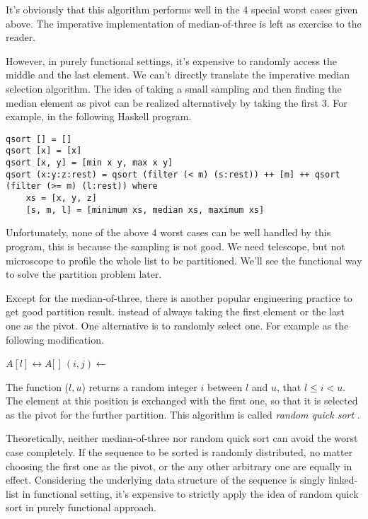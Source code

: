 \documentclass[UTF8]{article}
\begin{document}
It's obviously that this algorithm performs well in the 4 special worst cases given above.
The imperative implementation of median-of-three is left as exercise to the reader.

However, in purely functional settings, it's expensive to randomly access the middle and the last
element. We can't directly translate the imperative median selection algorithm. The idea of
taking a small sampling and then finding the median element as pivot can be realized alternatively
by taking the first 3. For example, in the following Haskell program.

\lstset{language=Haskell}
\begin{lstlisting}
qsort [] = []
qsort [x] = [x]
qsort [x, y] = [min x y, max x y]
qsort (x:y:z:rest) = qsort (filter (< m) (s:rest)) ++ [m] ++ qsort (filter (>= m) (l:rest)) where
    xs = [x, y, z]
    [s, m, l] = [minimum xs, median xs, maximum xs]
\end{lstlisting}

Unfortunately, none of the above 4 worst cases can be well handled by this program, this is because
the sampling is not good. We need telescope, but not microscope to profile the whole list to be
partitioned. We'll see the functional way to solve the partition problem later.

Except for the median-of-three, there is another popular engineering practice to get good partition
result. instead of always taking the first element or the last one as the pivot. One alternative is
to randomly select one. For example as the following modification.

\begin{algorithmic}[1]
    \State {} $A[l] \leftrightarrow A[$  $]$
    \State $(i, j) \gets $ 
    \State {}
    \State {}
  \EndIf
\EndProcedure
\end{algorithmic}

The function ($l, u$) returns a random integer $i$ between $l$ and $u$, that
$l \leq i < u$. The element at this position is exchanged with the first one, so that it is
selected as the pivot for the further partition. This algorithm is called {\em random quick sort} \cite{CLRS}.

Theoretically, neither median-of-three nor random quick sort can avoid the worst case completely.
If the sequence to be sorted is randomly distributed, no matter choosing the first one as the
pivot, or the any other arbitrary one are equally in effect. Considering the underlying data
structure of the sequence is singly linked-list in functional setting, it's expensive to
strictly apply the idea of random quick sort in purely functional approach.
\end{document}

